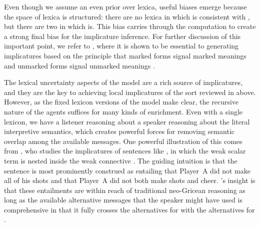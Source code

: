 \documentclass[leqno,12pt]{article}
\begin{document}
Even though we assume an even prior over lexica, useful biases emerge
because the space of lexica is structured: there are no lexica in
which  is consistent with , but there are two in
which  is. This bias carries through the computation to
create a strong final bias for the implicature inference. For further
discussion of this important point, we refer to
\citealt{Bergen:Levy:Goodman:2014}, where it is shown to be essential to
generating implicatures based on the principle that marked forms
signal marked meanings and unmarked forms signal unmarked meanings
\citep{McCawley78,Horn84,Blutner98,Levinson00}.


The lexical uncertainty aspects of the model are a rich source of
implicatures, and they are the key to achieving local implicatures of
the sort reviewed in  above. However, as the
fixed lexicon versions of the model make clear, the recursive nature
of the agents suffices for many kinds of enrichment. Even with a
single lexicon, we have a listener reasoning about a speaker reasoning
about the literal interpretive semantics, which creates powerful
forces for removing semantic overlap among the available messages. One
powerful illustration of this comes from
\citet{Sauerland01,Sauerland04}, who studies the implicatures of
sentences like , in
which the weak scalar term  is nested inside
the weak connective . The guiding intuition is that the
sentence is most prominently construed as entailing that Player~A did
not make all of his shots and that Player~A did not both make shots
and cheer. \citeauthor{Sauerland01}'s insight is that these
entailments are within reach of traditional neo-Gricean reasoning as
long as the available alternative messages that the speaker might have
used is comprehensive in that it fully crosses the alternatives for
 with the alternatives for .
\end{document}
